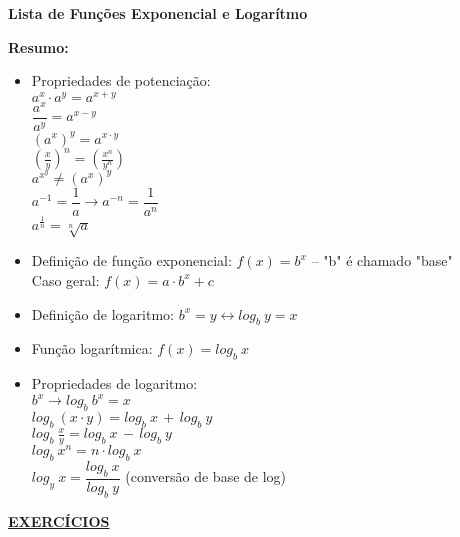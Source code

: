 \documentclass[a4paper, 11pt]{article}
\begin{document}
\begin{center}
\textbf{Lista de Funções Exponencial e Logarítmo}
\end{center}



\textbf{Resumo:}
\\



\begin{itemize}

\item Propriedades de potenciação:
\\
$a^{x} \cdot a^{y} = a^{x + y}$
\\
$\dfrac{a^{x} }{ a^{y} } = a^{x - y}$
\\
$(a^x)^y = a^{x \cdot y}$
\\
$( \frac{x}{y} )^n = (\frac{x^n}{y^n})$
\\
$a^{x^y} \neq (a^x)^y$
\\
$a^{-1} = \dfrac{1}{a} \longrightarrow a^{-n} = \dfrac{1}{a^n}$
\\
$a^{ \frac{1}{n} }= \sqrt[n]{a}$

\item Definição de função exponencial: $f(x) = b^{x}$ -- "b" é chamado "base"
\\
Caso geral: $f(x) = a \cdot b^{x} + c$

\item Definição de logaritmo: $b^{x} = y \longleftrightarrow log_{b} \ y = x$

\item Função logarítmica: $f(x) = log_{b} \ x$

\item Propriedades de logaritmo:
\\
$b^{x} \longrightarrow log_{b} \ b^{x} = x$
\\
$log_{b} \ (x \cdot y) = log_{b} \ x \, + \, log_{b} \ y$
\\
$log_{b} \ \frac{x}{y} = log_{b} \ x \, - \, log_{b} \ y$
\\
$log_{b} \ x^n = n \cdot log_{b} \ x$
\\
$log_{y} \ x = \dfrac{ log_{b} \ x }{ log_{b} \ y }$ (conversão de base de log)

\end{itemize}

\pagebreak



\begin{center}
\textbf{\underline{EXERCÍCIOS}}
\end{center}
\end{document}

